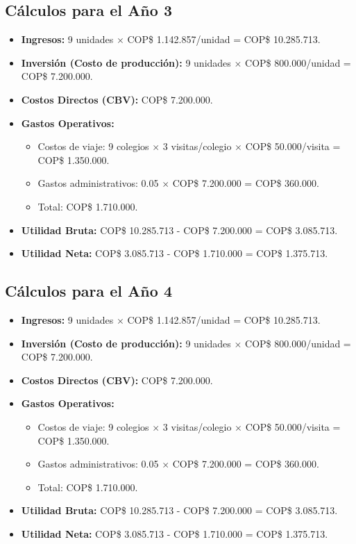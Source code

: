 \subsection*{Cálculos para el Año 3}
\begin{itemize}
    \item \textbf{Ingresos:} 9 unidades $\times$ COP\$ 1.142.857/unidad = 
			COP\$ 10.285.713.
    \item \textbf{Inversión (Costo de producción):} 
			9 unidades $\times$ COP\$ 800.000/unidad = COP\$ 7.200.000.
    \item \textbf{Costos Directos (CBV):} COP\$ 7.200.000.
    \item \textbf{Gastos Operativos:}
    \begin{itemize}
        \item Costos de viaje: 
					9 colegios $\times$ 3 visitas/colegio $\times$ COP\$ 50.000/visita = 
					COP\$ 1.350.000.
        \item Gastos administrativos: 0.05 $\times$ COP\$ 7.200.000 = 
					COP\$ 360.000.
        \item Total: COP\$ 1.710.000.
    \end{itemize}
    \item \textbf{Utilidad Bruta:} COP\$ 10.285.713 - COP\$ 7.200.000 = COP\$ 3.085.713.
    \item \textbf{Utilidad Neta:} COP\$ 3.085.713 - COP\$ 1.710.000 = COP\$ 1.375.713.
\end{itemize}

\subsection*{Cálculos para el Año 4}
\begin{itemize}
    \item \textbf{Ingresos:} 
			9 unidades $\times$ COP\$ 1.142.857/unidad = COP\$ 10.285.713.
    \item \textbf{Inversión (Costo de producción):} 
			9 unidades $\times$ COP\$ 800.000/unidad = COP\$ 7.200.000.
    \item \textbf{Costos Directos (CBV):} COP\$ 7.200.000.
    \item \textbf{Gastos Operativos:}
    \begin{itemize}
        \item Costos de viaje: 
					9 colegios $\times$ 3 visitas/colegio $\times$ COP\$ 50.000/visita = 
					COP\$ 1.350.000.
        \item Gastos administrativos: 
					0.05 $\times$ COP\$ 7.200.000 = COP\$ 360.000.
        \item Total: COP\$ 1.710.000.
    \end{itemize}
    \item \textbf{Utilidad Bruta:} COP\$ 10.285.713 - COP\$ 7.200.000 = COP\$ 3.085.713.
    \item \textbf{Utilidad Neta:} COP\$ 3.085.713 - COP\$ 1.710.000 = COP\$ 1.375.713.
\end{itemize}

